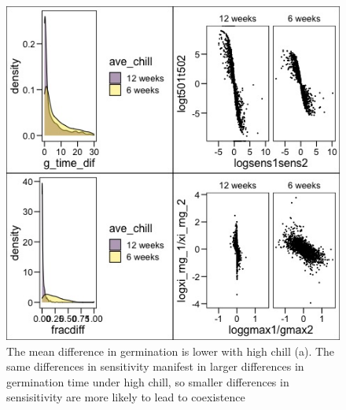 \documentclass{article}
\begin{document}
\begin{figure}[h!]
  \centering
 \includegraphics[width=\textwidth]{..//plots/coexistance_chilldiffs.jpeg}
    \caption{The mean difference in germination is lower with high chill (a). The same differences in sensitivity manifest in larger differences in germination time under high chill, so smaller differences in sensisitivity are more likely to lead to coexistence}
    \label{Fig:differences}
\end{figure}
\end{document}
